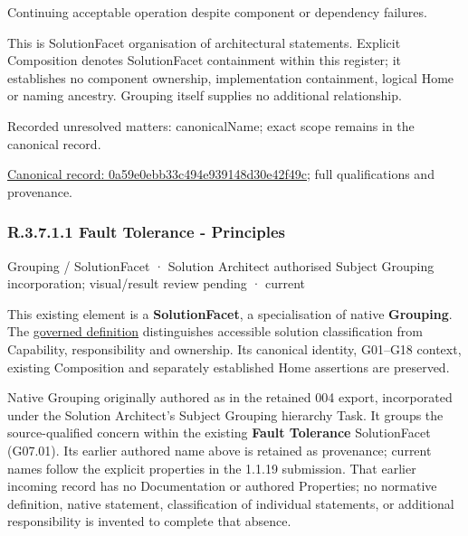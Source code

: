 Continuing acceptable operation despite component or dependency failures.



This is SolutionFacet organisation of architectural statements. Explicit Composition denotes SolutionFacet containment within this register; it establishes no component ownership, implementation containment, logical Home or naming ancestry. Grouping itself supplies no additional relationship.


{\small Recorded unresolved matters: canonicalName; exact scope remains in the canonical record.}\par
{\footnotesize \href{../../../../../../../continuum/grouping/0a59e0ebb33c494e939148d30e42f49c.md}{Canonical record: 0a59e0ebb33c494e939148d30e42f49c}; full qualifications and provenance.}\par
\subsubsection*{R.3.7.1.1 Fault Tolerance - Principles}
\label{navigation:R.3.7.1.1}

\label{element:3566f7776b8741699f48139e1c6b8ec8}
{\small Grouping / SolutionFacet · Solution Architect authorised Subject Grouping incorporation; visual/result review pending · current}\par

This existing element is a \textbf{SolutionFacet}, a specialisation of native
\textbf{Grouping}. The \href{\detokenize{../../../../../../../governance/continuum-representation.md#solutionfacet-classification--1119-candidate}}{governed definition}
distinguishes accessible solution classification from Capability, responsibility
and ownership. Its canonical identity, G01–G18 context, existing Composition
and separately established Home assertions are preserved.



Native Grouping originally authored as \texttt{} in the retained 004 export,
incorporated under the Solution Architect's Subject Grouping hierarchy Task.
It groups the source-qualified \texttt{} concern within
the existing \textbf{Fault Tolerance} SolutionFacet (G07.01). Its earlier authored name above is retained as provenance; current names
follow the explicit properties in the 1.1.19 submission.
That earlier incoming record has no Documentation or authored Properties; no normative
definition, native statement, classification of individual statements, or
additional responsibility is invented to complete that absence.



